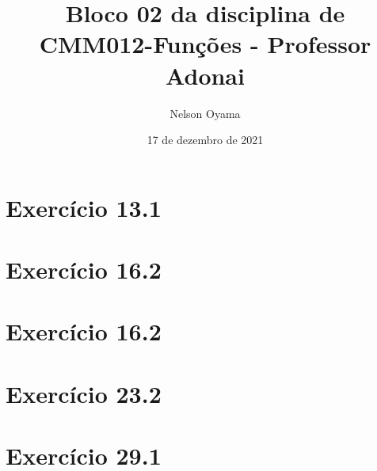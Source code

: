 \documentclass[a4paper]{article}
\author{Nelson Oyama}
\title{Bloco 02 da disciplina de CMM012-Funções - Professor Adonai}
\date{17 de dezembro de 2021}
\begin{document}
	\maketitle

	\section{Exercício 13.1}
	
	
	\section{Exercício 16.2}
	

	\section{Exercício 16.2}
	
	
	\section{Exercício 23.2}
	
	\newpage
	\section{Exercício 29.1}
	
	
	
\end{document}
